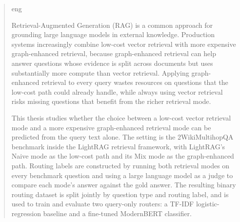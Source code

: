 \documentclass[english, bibtex]{kththesis}               %
\newcommand*{\generalExpl}[1]{\todo[inline]{#1}}
\newcommand*{\engExpl}[1]{\todo[inline, backgroundcolor=kth-lightgreen40]{#1}} %
\renewcommand\generalExpl[1]{}
\renewcommand\engExpl[1]{}
\numberwithin{listing}{chapter}
\begin{document}
\begin{abstract}
  \markboth{\abstractname}{}
\begin{scontents}[store-env=lang]
eng
\end{scontents}
\engExpl{All theses at KTH are \textbf{required} to have an abstract in both \textit{English} and \textit{Swedish}.}

\engExpl{Exchange students may want to include one or more abstracts in the language(s) used in their home institutions to avoid the need to write another thesis when returning to their home institution.}

\generalExpl{Keep in mind that most of your potential readers are only going to read your \texttt{title} and \texttt{abstract}. This is why the abstract must give them enough information so that they can decide if this document is relevant to them or not. Otherwise, the likely default choice is to ignore the rest of your document.\\
An abstract should stand on its own, \ie no citations, cross-references to the body of the document, acronyms must be spelled out, \ldots .\\Write this early and revise as necessary. This will help keep you focused on what you are trying to do.}

\begin{scontents}[store-env=abstracts,print-env=true]
Retrieval-Augmented Generation (RAG) is a common approach for grounding large language models in external knowledge. Production systems increasingly combine low-cost vector retrieval with more expensive graph-enhanced retrieval, because graph-enhanced retrieval can help answer questions whose evidence is split across documents but uses substantially more compute than vector retrieval. Applying graph-enhanced retrieval to every query wastes resources on questions that the low-cost path could already handle, while always using vector retrieval risks missing questions that benefit from the richer retrieval mode.

This thesis studies whether the choice between a low-cost vector retrieval mode and a more expensive graph-enhanced retrieval mode can be predicted from the query text alone. The setting is the 2WikiMultihopQA benchmark inside the LightRAG retrieval framework, with LightRAG's Naive mode as the low-cost path and its Mix mode as the graph-enhanced path. Routing labels are constructed by running both retrieval modes on every benchmark question and using a large language model as a judge to compare each mode's answer against the gold answer. The resulting binary routing dataset is split jointly by question type and routing label, and is used to train and evaluate two query-only routers: a TF-IDF logistic-regression baseline and a fine-tuned ModernBERT classifier.


\end{scontents}
\end{abstract}
\end{document}
